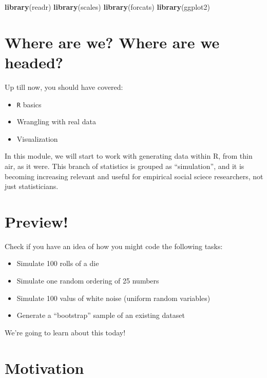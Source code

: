 \documentclass[]{book}
\newenvironment{Shaded}{\begin{snugshade}}{\end{snugshade}}
\newcommand{\KeywordTok}[1]{\textcolor[rgb]{0.13,0.29,0.53}{\textbf{#1}}}
\newcommand{\NormalTok}[1]{#1}
\providecommand{\tightlist}{%
  \setlength{\itemsep}{0pt}\setlength{\parskip}{0pt}}
\theoremstyle{definition}
\theoremstyle{definition}
\theoremstyle{definition}
\theoremstyle{remark}
\begin{document}
\begin{Shaded}
\begin{Highlighting}[]
\KeywordTok{library}\NormalTok{(readr)}
\KeywordTok{library}\NormalTok{(scales)}
\KeywordTok{library}\NormalTok{(forcats)}
\KeywordTok{library}\NormalTok{(ggplot2)}
\end{Highlighting}
\end{Shaded}

\section{Where are we? Where are we
headed?}\label{where-are-we-where-are-we-headed-4}

Up till now, you should have covered:

\begin{itemize}
\tightlist
\item
  \texttt{R} basics
\item
  Wrangling with real data
\item
  Visualization
\end{itemize}

In this module, we will start to work with generating data within R,
from thin air, as it were. This branch of statistics is grouped as
``simulation'', and it is becoming increasing relevant and useful for
empirical social sciece researchers, not just statisticians.

\section{Preview!}\label{preview}

Check if you have an idea of how you might code the following tasks:

\begin{itemize}
\tightlist
\item
  Simulate 100 rolls of a die
\item
  Simulate one random ordering of 25 numbers
\item
  Simulate 100 valus of white noise (uniform random variables)
\item
  Generate a ``bootstrap'' sample of an existing dataset
\end{itemize}

We're going to learn about this today!

\section{Motivation}\label{motivation-3}
\end{document}
